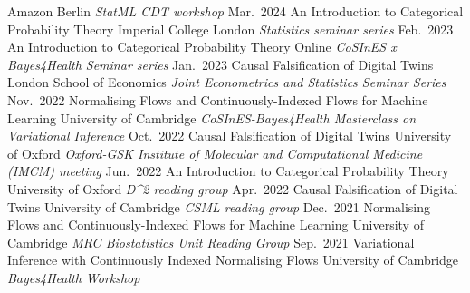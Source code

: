 \documentclass[9pt]{developercv} %
\begin{document}
\begin{entrylist}
        {Amazon Berlin}
        {\textit{StatML CDT workshop}}
    \entry
        {Mar.\ 2024}
        {An Introduction to Categorical Probability Theory}
        {Imperial College London}
        {\textit{Statistics seminar series}}
    \entry
        {Feb.\ 2023}
        {An Introduction to Categorical Probability Theory}
        {Online}
        {\textit{CoSInES x Bayes4Health Seminar series}}
    \entry
        {Jan.\ 2023}
        {Causal Falsification of Digital Twins}
        {London School of Economics}
        {\textit{Joint Econometrics and Statistics Seminar Series}}
    \entry
        {Nov.\ 2022}
        {Normalising Flows and Continuously-Indexed Flows for Machine Learning}
        {University of Cambridge}
        {\textit{CoSInES-Bayes4Health Masterclass on Variational Inference}}
    \entry
        {Oct.\ 2022}
        {Causal Falsification of Digital Twins}
        {University of Oxford}
        {\textit{Oxford-GSK Institute of Molecular and Computational Medicine (IMCM) meeting}}
    \entry
        {Jun.\ 2022}
        {An Introduction to Categorical Probability Theory}
        {University of Oxford}
        {\textit{D\textasciicircum 2 reading group}}
    \entry
        {Apr.\ 2022}
        {Causal Falsification of Digital Twins}
        {University of Cambridge}
        {\textit{CSML reading group}}
    \entry
        {Dec.\ 2021}
        {Normalising Flows and Continuously-Indexed Flows for Machine Learning}
        {University of Cambridge}
        {\textit{MRC Biostatistics Unit Reading Group}}
    \entry
        {Sep.\ 2021}%
        {Variational Inference with Continuously Indexed Normalising Flows}
        {University of Cambridge}
        {\textit{Bayes4Health Workshop}}
\end{entrylist}

\end{document}

